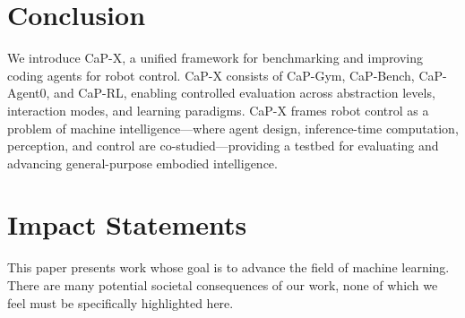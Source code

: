 \section{Conclusion}

We introduce CaP-X, a unified framework for benchmarking and improving coding agents for robot control. CaP-X consists of CaP-Gym, CaP-Bench, CaP-Agent0, and CaP-RL, enabling controlled evaluation across abstraction levels, interaction modes, and learning paradigms. CaP-X frames robot control as a problem of machine intelligence—where agent design, inference-time computation, perception, and control are co-studied—providing a testbed for evaluating and advancing general-purpose embodied intelligence.

\section{Impact Statements}

This paper presents work whose goal is to advance the field of machine learning. There are many potential societal consequences of our work, none of which we feel must be specifically highlighted here.

